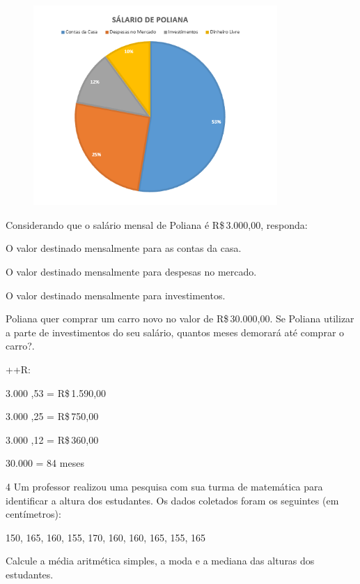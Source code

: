 \begin{figure}[H]
\centering\includegraphics[width=3.65in,height=2.98179in]{./imgSAEB_8_MAT/media/image41.png}
\end{figure}

Considerando que o salário mensal de Poliana é R\$\,3.000,00, responda:
\item O valor destinado mensalmente para as contas da casa.
\item O valor destinado mensalmente para despesas no mercado.
\item O valor destinado mensalmente para investimentos.
\item Poliana quer comprar um carro novo no valor de R\$\,30.000,00. Se
Poliana utilizar a parte de investimentos do seu salário, quantos meses
demorará até comprar o carro?.

++R:
\item 3.000 ,53 = R\$\,1.590,00
\item 3.000 ,25 = R\$\,750,00
\item 3.000 ,12 = R\$\,360,00
\item 30.000  = 84 meses

\num{4} Um professor realizou uma pesquisa com sua turma de matemática para
identificar a altura dos estudantes. Os dados coletados foram os
seguintes (em centímetros):

150, 165, 160, 155, 170, 160, 160, 165, 155, 165

Calcule a média aritmética simples, a moda e a mediana das alturas dos
estudantes.

